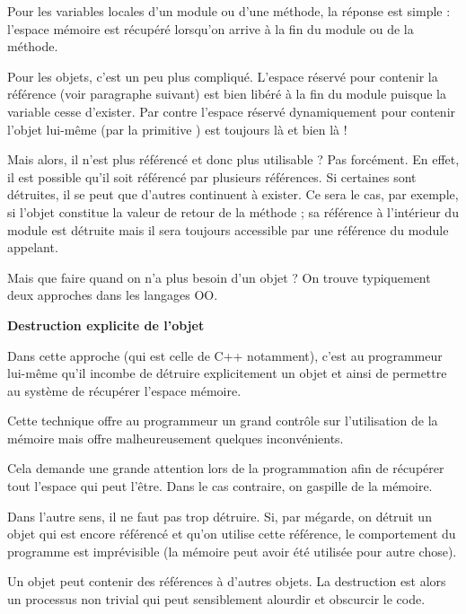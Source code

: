 Pour les variables locales d’un module ou d'une
méthode, la réponse est simple : l’espace mémoire est récupéré
lorsqu’on arrive à la fin du module ou de la méthode.

Pour les objets, c’est un peu plus compliqué. L’espace réservé pour
contenir la référence (voir paragraphe suivant) est bien libéré à la
fin du module puisque la variable cesse d’exister. Par contre l’espace
réservé dynamiquement pour contenir l’objet lui-même (par la primitive
) est toujours là et bien là !

Mais alors, il n’est plus référencé et donc plus utilisable ? Pas
forcément. En effet, il est possible qu’il soit référencé par plusieurs
références. Si certaines sont détruites, il se peut que d’autres
continuent à exister. Ce sera le cas, par exemple, si l’objet constitue
la valeur de retour de la méthode ; sa référence à l’intérieur du
module est détruite mais il sera toujours accessible par une référence
du module appelant.

Mais que faire quand on n’a plus besoin d’un objet ? On trouve
typiquement deux approches dans les langages OO.

{\sffamily\bfseries\upshape
Destruction explicite de l’objet}

Dans cette approche (qui est celle de C++ notamment), c’est au
programmeur lui-même qu’il incombe de détruire explicitement un objet
et ainsi de permettre au système de récupérer l’espace mémoire. 

Cette technique offre au programmeur un grand contrôle sur l’utilisation
de la mémoire mais offre malheureusement quelques inconvénients.

\begin{liste}
	\item 
		Cela demande une grande attention lors de la programmation afin de
		récupérer tout l’espace qui peut l’être. Dans le cas contraire, on
		gaspille de la mémoire.
	\item 
		Dans l’autre sens, il ne faut pas trop détruire. Si, par mégarde, on
		détruit un objet qui est encore référencé et qu'on
		utilise cette référence, le comportement du programme est imprévisible
		(la mémoire peut avoir été utilisée pour autre chose).
	\item 
		Un objet peut contenir des références à d’autres objets. La destruction
		est alors un processus non trivial qui peut sensiblement alourdir et
		obscurcir le code.
\end{liste}

